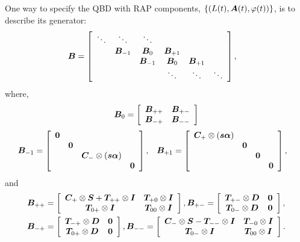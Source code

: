 One way to specify the QBD with RAP components, \(\left\{(L(t),\boldsymbol A(t),{\varphi}(t))\right\}\), is to describe its generator:
\begin{align*}
\boldsymbol{B} &= \left[\begin{array}{cccccc}
 \ddots & \ddots & \ddots & & & \\
 & \boldsymbol{B}_{-1} & \boldsymbol{B}_0 & \boldsymbol{B}_{+1} & & \\ 
 & &  \boldsymbol{B}_{-1} & \boldsymbol{B}_0 & \boldsymbol{B}_{+1} & \\
 & & & \ddots & \ddots & \ddots 
\end{array}\right],
\end{align*}
{where,}
\begin{align*}
	\boldsymbol B_0 &= \left[\begin{array}{ccc} \boldsymbol B_{++} & \boldsymbol B_{+-} \\ \boldsymbol B_{-+} & \boldsymbol B_{--}\end{array}\right]\\
\end{align*}
\begin{align*}
	\boldsymbol{B}_{-1} &= \left[\begin{array}{cccc}
		\boldsymbol 0 & & & \\
		& \boldsymbol 0 & & \\
		& & \boldsymbol{C}_-\otimes (\boldsymbol s\boldsymbol\alpha) & \\ 
		& & & \boldsymbol 0
		\end{array}\right],
	&& \boldsymbol{B}_{+1} = \left[\begin{array}{cccc}
		\boldsymbol{C}_+\otimes (\boldsymbol s\boldsymbol\alpha) & & & \\
		& \boldsymbol 0 & & \\
		& & \boldsymbol 0 & \\ 
		& & & \boldsymbol 0
		\end{array}\right],
\end{align*}
and
\begin{align*}
	\boldsymbol{B}_{++}  &= \left[\begin{array}{cc} \boldsymbol{C}_+\otimes \boldsymbol{S}  + \boldsymbol{T}_{++}\otimes \boldsymbol{I} & \boldsymbol T_{+0}\otimes \boldsymbol I \\ \boldsymbol T_{0+}\otimes \boldsymbol I & \boldsymbol T_{00}\otimes \boldsymbol I\end{array}\right] ,
	\boldsymbol{B}_{+-}  = \left[\begin{array}{cc} \boldsymbol{T}_{+-}\otimes \boldsymbol{D}  & \boldsymbol 0 \\ \boldsymbol T_{0-}\otimes \boldsymbol D  & \boldsymbol 0 \end{array}\right],
	\\ \boldsymbol{B}_{-+}  &=  \left[\begin{array}{cc} \boldsymbol{T}_{-+}\otimes \boldsymbol{D}  & \boldsymbol 0 \\ \boldsymbol T_{0+}\otimes \boldsymbol D  & \boldsymbol 0 \end{array}\right] ,
	\boldsymbol{B}_{--}  = \left[\begin{array}{cc} \boldsymbol{C}_-\otimes \boldsymbol{S}  - \boldsymbol{T}_{--}\otimes \boldsymbol{I} & \boldsymbol T_{-0}\otimes \boldsymbol I \\ \boldsymbol T_{0-}\otimes \boldsymbol I & \boldsymbol T_{00}\otimes \boldsymbol I\end{array}\right].
\end{align*}


